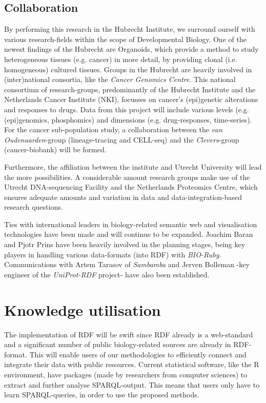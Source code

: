\documentclass[twoside,fontsize=10pt]{article}
\begin{document}
\subsection*{Collaboration}
By performing this research in the Hubrecht Institute, we surround ourself with various research-fields within the scope of Developmental Biology. One of the newest findings of the Hubrecht are Organoids, which provide a method to study heterogeneous tissues (e.g. cancer) in more detail, by providing clonal (i.e. homogeneous) cultured tissues. Groups in the Hubrecht are heavily involved in (inter)national consortia, like the \textit{Cancer Genomics Centre}. This national consortium of research-groups, predominantly of the Hubrecht Institute and the Netherlands Cancer Institute (NKI), focusses on cancer's (epi)genetic alterations and responses to drugs. Data from this project will include various levels (e.g. (epi)genomics, phosphomics) and dimensions (e.g. drug-responses, time-series). For the cancer sub-population study, a collaboration between the \textit{van Oudenaarden}-group (lineage-tracing and CELL-seq) and the \textit{Clevers}-group (cancer-biobank) will be formed.

Furthermore, the affiliation between the institute and Utrecht University will lead the more possibilities. A considerable amount research groups make use of the Utrecht DNA-sequencing Facility and the Netherlands Proteomics Centre, which ensures adequate amounts and variation in data and data-integration-based research questions. 

Ties with international leaders in biology-related semantic web and visualisation technologies have been made and will continue to be expanded. Joachim Baran and Pjotr Prins have been heavily involved in the planning stages, being key players in handling various data-formats (into RDF) with \textit{BIO-Ruby}. Communications with Artem Tarasov of \textit{Sambamba} and Jerven Bolleman -key engineer of the \textit{UniProt-RDF} project- have also been established.
\section*{Knowledge utilisation}
The implementation of RDF will be swift since RDF already is a web-standard and a significant number of public biology-related sources are already in RDF-format. This will enable users of our methodologies to efficiently connect and integrate their data with public resources. Current statistical software, like the R environment, have packages (made by researchers from computer sciences) to extract and further analyse SPARQL-output. This means that users only have to learn SPARQL-queries, in order to use the proposed methods.
\end{document}

